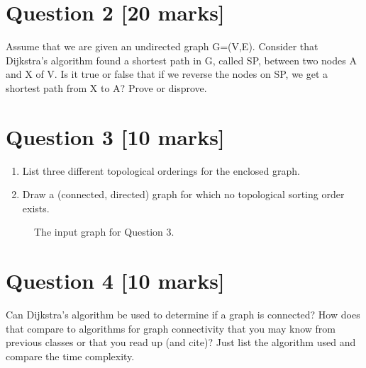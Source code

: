 \documentclass[11pt]{article}
\begin{document}
\section*{Question 2 [20 marks]}
Assume that we are given an undirected graph G=(V,E).  Consider that Dijkstra's algorithm found a shortest path in G, called SP,  between two nodes A and X of V. Is it true or false that if we reverse the nodes on SP, we get a shortest path from X to A? Prove or disprove. 



\section*{Question 3 [10 marks]}

\begin{enumerate}
	\item
List three different topological orderings for the enclosed graph.
\item Draw a (connected, directed) graph for which no topological sorting order exists.
\end{enumerate}
	
	
\begin{figure}[!ht]
	\centerline{}
	\caption{The input graph for Question 3.}
	\label{fig:SP}
\end{figure}

\section*{Question 4 [10 marks]}
Can Dijkstra's algorithm be used to determine if a graph is connected? How does that compare to algorithms for graph connectivity that you may know from previous classes or that you read up (and cite)? Just list the algorithm used and compare the time complexity.
\end{document}
